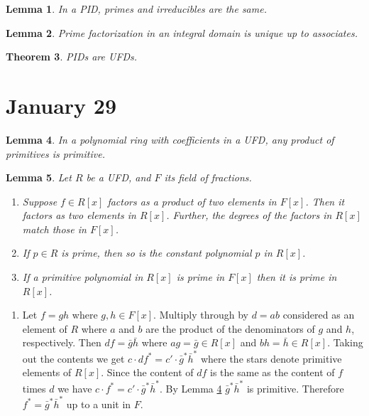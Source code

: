 \documentclass[letterpaper]{article}
\newtheorem{theorem}{Theorem}[section]
\newtheorem{lemma}[theorem]{Lemma}
\newenvironment{proof}[1][Proof]{\begin{trivlist}
\item[\hskip \labelsep {\bfseries #1}]}{\end{trivlist}}
\begin{document}
\begin{lemma}
In a PID, primes and irreducibles are the same.
\end{lemma}

\begin{lemma}
Prime factorization in an integral domain is unique up to associates.
\end{lemma}

\begin{theorem}
PIDs are UFDs.
\end{theorem}

\section{January 29}

\begin{lemma}
\label{prim}
In a polynomial ring with coefficients in a UFD, any product of primitives is primitive.
\end{lemma}

\begin{lemma}
Let $R$ be a UFD, and $F$ its field of fractions.
\begin{enumerate}
\item Suppose $f \in R[x]$ factors as a product of two elements in $F[x]$. Then it factors as two  elements in $R[x]$. Further, the degrees of the factors in $R[x]$ match those in $F[x]$.
\item If $p \in R$ is prime, then so is the constant polynomial $p$ in $R[x]$.
\item If a primitive polynomial in $R[x]$ is prime in $F[x]$ then it is prime in $R[x]$.
\end{enumerate}
\end{lemma}

\begin{proof}
\begin{enumerate}
\item Let $f = gh$ where $g,h \in F[x]$. Multiply through by $d=ab$ considered as an element of $R$ where $a$ and $b$ are the product of the denominators of $g$ and $h$, respectively.  Then $df = \bar{g} \bar{h}$ where $ag = \bar{g} \in R[x]$ and $bh = \bar{h} \in R[x]$.  Taking out the contents we get $c \cdot df^* = c' \cdot \bar{g}^* \bar{h}^*$ where the stars denote primitive elements of $R[x]$. Since the content of $df$ is the same as the content of $f$ times $d$ we have $c \cdot f^* = c' \cdot \bar{g}^* \bar{h}^*$. By Lemma \ref{prim} $\bar{g}^* \bar{h}^*$ is primitive. Therefore $f^* = \bar{g}^* \bar{h}^*$ up to a unit in $F$.
\end{enumerate}

\end{proof}
\end{document}
